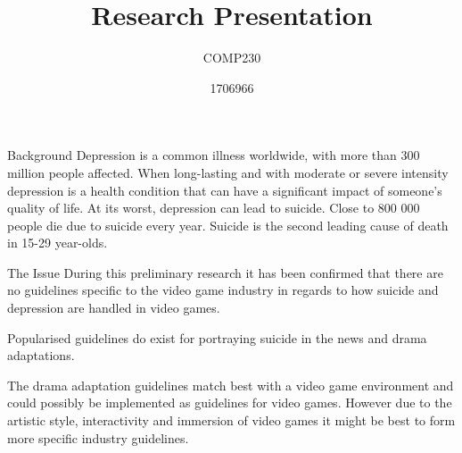 \documentclass{beamer}
\title{Research Presentation}
\subtitle{COMP230}
\author{1706966}
\begin{document}
\begin{frame}
	\maketitle
\end{frame}

\begin{frame}{Background}
	Depression is a common illness worldwide, with more than 300 million people affected. When long-lasting and with moderate or severe intensity depression is a health condition that can have a significant impact of someone's quality of life. At its worst, depression can lead to suicide. Close to 800 000 people die due to suicide every year. Suicide is the second leading cause of death in 15-29 year-olds\cite{DepressionStats}.
\end{frame}

\begin{frame}{The Issue}
	During this preliminary research it has been confirmed that there are no guidelines specific to the video game industry in regards to how suicide and depression are handled in video games.\vspace{5mm} %
	
	Popularised guidelines do exist for portraying suicide in the news\cite{world2017preventing}\cite{nepon2009media} and drama adaptations\cite{DramaGuidelines}. \vspace{5mm} %
	
	The drama adaptation guidelines match best with a video game environment and could possibly be implemented as guidelines for video games. However due to the artistic style, interactivity and immersion of video games it might be best to form more specific industry guidelines.   
\end{frame}
\end{document}
